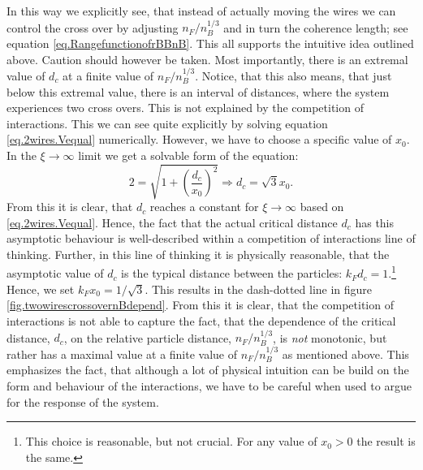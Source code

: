 In this way we explicitly see, that instead of actually moving the wires we can control the cross over by adjusting $n_F/n_B^{1/3}$ and in turn the coherence length; see equation \eqref{eq.RangefunctionofrBBnB}. This all supports the intuitive idea outlined above. Caution should however be taken. Most importantly, there is an extremal value of $d_c$ at a finite value of $n_F/n_B^{1/3}$. Notice, that this also means, that just below this extremal value, there is an interval of distances, where the system experiences two cross overs. This is not explained by the competition of interactions. This we can see quite explicitly by solving equation \eqref{eq.2wires.Vequal} numerically. However, we have to choose a specific value of $x_0$. In the $\xi \to \infty$ limit we get a solvable form of the equation:
\begin{equation}
2 = \sqrt{1 + \left(\frac{d_c}{x_0}\right)^2} \Rightarrow d_c = \sqrt{3} x_0. \nonumber
\end{equation}
From this it is clear, that $d_c$ reaches a constant for $\xi \to \infty$ based on \eqref{eq.2wires.Vequal}. Hence, the fact that the actual critical distance $d_c$ has this asymptotic behaviour is well-described within a competition of interactions line of thinking. Further, in this line of thinking it is physically reasonable, that the asymptotic value of $d_c$ is the typical distance between the particles: $k_Fd_c = 1$.\footnote{This choice is reasonable, but not crucial. For any value of $x_0 > 0$ the result is the same.} Hence, we set $k_Fx_0 = 1/\sqrt{3}$. This results in the dash-dotted line in figure \ref{fig.twowirescrossovernBdepend}. From this it is clear, that the competition of interactions is not able to capture the fact, that the dependence of the critical distance, $d_c$, on the relative particle distance, $n_F/n_B^{1/3}$, is \textit{not} monotonic, but rather has a maximal value at a finite value of $n_F/n_B^{1/3}$ as mentioned above. This emphasizes the fact, that although a lot of physical intuition can be build on the form and behaviour of the interactions, we have to be careful when used to argue for the response of the system.

